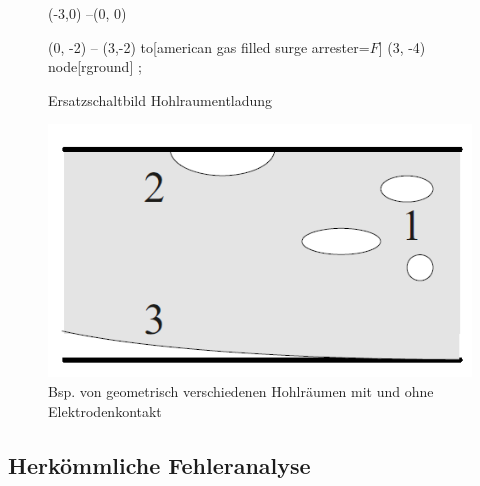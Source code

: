 \begin{refsection}
\begin{figure}
\begin{circuitikz} [european, scale=0.5]
		(-3,0) --(0, 0)
		
		(0, -2) -- (3,-2) to[american gas filled surge arrester=$F$] (3, -4)
		node[rground]{} 
		;
	\end{circuitikz}
	\caption{Ersatzschaltbild Hohlraumentladung} 
	\label{fig:M2}
	\end{figure}

\begin{figure}
	\centering
	\includegraphics[width=0.5\linewidth]{papers/gis/Bilder/Hohlraum}
	\caption[]{Bsp. von geometrisch verschiedenen Hohlräumen mit und ohne Elektrodenkontakt \cite{buch:Kuchler}}
	\label{fig:hohlraum}
\end{figure}
  
\subsection{Herkömmliche Fehleranalyse}


\end{refsection}
